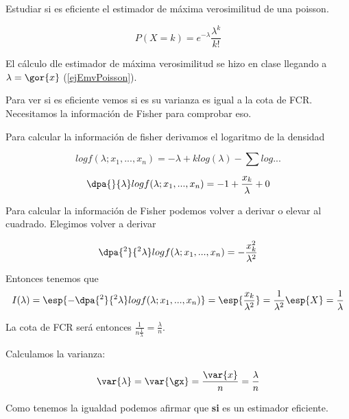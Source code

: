 \begin{problem}[4]
Estudiar si es eficiente el estimador de máxima verosimilitud de una poisson.
\solution

\[ P(X = k) = e^{-\lambda} \frac{\lambda^{k}}{k!} \]

El cálculo dle estimador de máxima verosimilitud se hizo en clase llegando a $\lambda = \gor{x}$ (\ref{ejEmvPoisson}).

Para ver si es eficiente vemos si es su varianza es igual a la cota de FCR. Necesitamos la información de Fisher para comprobar eso.

Para calcular la información de fisher derivamos el logaritmo de la densidad

\[log f(\lambda;x_1,...,x_n) = -\lambda + k log(\lambda) - \sum log...\]

\[\dpa{}{\lambda} log f (\lambda;x_1,...,x_n) = - 1 + \frac{x_k}{\lambda} + 0\]

Para calcular la información de Fisher podemos volver a derivar o elevar al cuadrado. Elegimos volver a derivar

\[\dpa{^2}{^2\lambda} log f (\lambda;x_1,...,x_n) = -\frac{x_k^2}{\lambda^2}\]

Entonces tenemos que \[I(\lambda) = \esp{-\dpa{^2}{^2\lambda} log f (\lambda;x_1,...,x_n)} = \esp{\frac{x_k}{\lambda^2}} = \frac{1}{\lambda^2}\esp{X} = \frac{1}{\lambda}\]

La cota de FCR será entonces $\displaystyle\frac{1}{n\frac{1}{\lambda}} = \frac{\lambda}{n}$.

Calculamos la varianza:

\[\var{\lambda} = \var{\gx} = \frac{\var{x}}{n} = \frac{\lambda}{n}\]

Como tenemos la igualdad podemos afirmar que \textbf{si} es un estimador eficiente.
\end{problem}

